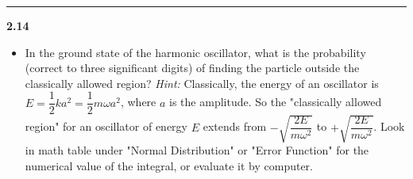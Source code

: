 \documentclass[fleqn]{article}
\begin{document}
\begin{itemize}
\begin{enumerate}
    \end{enumerate}
  \end{itemize}

  \rule{15cm}{1pt}

  \textbf{2.14}
  \begin{itemize}
    \item In the ground state of the harmonic oscillator, what is the probability (correct to three
    significant digits) of finding the particle outside the classically allowed region?
    \emph{Hint:} Classically, the energy of an oscillator is $E=\dfrac{1}{2}ka^2=\dfrac{1}{2}m \omega a^2$,
    where $a$ is the amplitude. So the "classically allowed region" for an oscillator of energy $E$
    extends from $-\sqrt{\dfrac{2E}{m \omega^2}}$ to $+\sqrt{\dfrac{2E}{m \omega^2}}$. Look in math table
    under "Normal Distribution" or "Error Function" for the numerical value of the integral, or evaluate
    it by computer.


\end{itemize}
\end{document}
